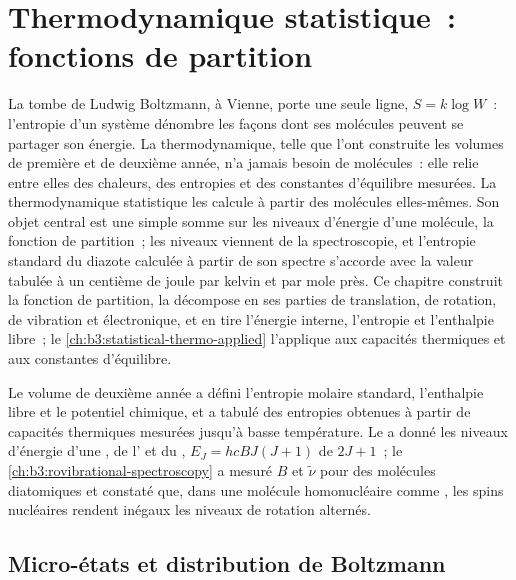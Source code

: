 \chapter{Thermodynamique statistique~: fonctions de partition}\label{ch:b3:partition-functions}

La tombe de Ludwig Boltzmann, à Vienne, porte une seule ligne,
$S = k\log W$~: l'entropie d'un système dénombre les façons dont ses
molécules peuvent se partager son énergie. La thermodynamique, telle que
l'ont construite les volumes de première et de deuxième année, n'a
jamais besoin de molécules~: elle relie entre elles des chaleurs, des
entropies et des constantes d'équilibre mesurées. La thermodynamique
statistique les calcule à partir des molécules elles-mêmes. Son objet
central est une simple somme sur les niveaux d'énergie d'une molécule,
la fonction de partition~; les niveaux viennent de la spectroscopie, et
l'entropie standard du diazote calculée à partir de son spectre
s'accorde avec la valeur tabulée à un centième de joule par kelvin et
par mole près. Ce chapitre construit la fonction de partition, la
décompose en ses parties de translation, de rotation, de vibration et
électronique, et en tire l'énergie interne, l'entropie et l'enthalpie
libre~; le \cref{ch:b3:statistical-thermo-applied} l'applique aux
capacités thermiques et aux constantes d'équilibre.

\begin{recall}
Le volume de deuxième année a défini l'entropie molaire standard,
l'enthalpie libre et le potentiel chimique, et a tabulé des entropies
obtenues à partir de capacités thermiques mesurées jusqu'à basse
température. Le  a donné les niveaux
d'énergie d'une , de l' et
du , $E_J = hcBJ(J+1)$ de  $2J + 1$~; le
\cref{ch:b3:rovibrational-spectroscopy} a mesuré $B$ et $\tilde\nu$ pour
des molécules diatomiques et constaté que, dans une molécule
homonucléaire comme , les spins nucléaires rendent inégaux les
niveaux de rotation alternés.
\end{recall}

\section{Micro-états et distribution de Boltzmann}

